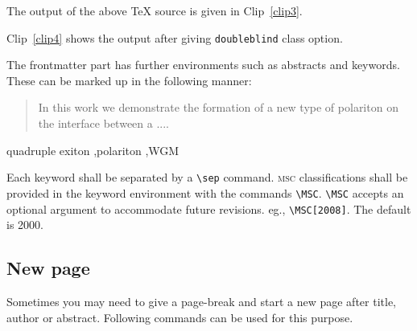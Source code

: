 \documentclass[a4paper,12pt]{article}
\begin{document}
\vspace*{-.5pc}

\begin{vquote}
\end{vquote}

The output of the above \TeX{} source is given in Clip~\ref{clip3}.

\def\rulecolor{blue!70}
\def\rulecolor{orange}
\pagebreak

Clip~\ref{clip4} shows the output after giving \verb+doubleblind+ class option. 

\def\rulecolor{blue!70}
\def\rulecolor{orange}

\vspace*{-.5pc}
The frontmatter part has further environments such as abstracts and
keywords.  These can be marked up in the following manner:

\begin{vquote}
 \begin{abstract}
  In this work we demonstrate the formation of a new type of 
  polariton on the interface between a ....
 \end{abstract}
\end{vquote} 

\vspace*{-.5pc}
\begin{vquote}
 \begin{keyword}
  quadruple exiton \sep polariton \sep WGM
 \end{keyword}
\end{vquote}

\noindent Each keyword shall be separated by a \verb+\sep+ command.
\textsc{msc} classifications shall be provided in 
the keyword environment with the commands
\verb+\MSC+. \verb+\MSC+ accepts an optional
argument to accommodate future revisions.
eg., \verb=\MSC[2008]=. The default is 2000.

\subsection{New page}
Sometimes you may need to give a page-break and start a new page after
title, author or abstract. Following commands can be used for this
purpose.
\end{document}
